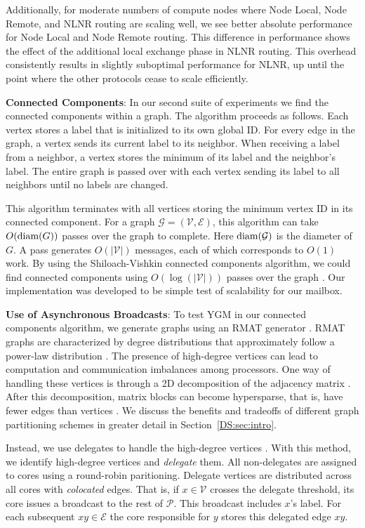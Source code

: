 \documentclass[10]{report}
\begin{document}
Additionally, for moderate numbers of compute nodes where Node Local, Node Remote, and NLNR routing are scaling well, we
see better absolute performance for Node Local and Node Remote routing. 
This difference in performance shows the effect of the additional local exchange phase in NLNR routing.
This overhead consistently results in slightly suboptimal performance for NLNR, up until the point where the other protocols cease to scale efficiently.  


\noindent
\textbf{Connected Components}:
In our second suite of experiments we find the connected components within a graph. 
The algorithm proceeds as follows.
Each vertex stores a label that is initialized to its own global ID. 
For every edge in the graph, a vertex sends its current label to its neighbor. 
When receiving a label from a neighbor, a vertex stores the minimum of its label and the neighbor's label. 
The entire graph is passed over with each vertex sending its label to all neighbors until no labels are changed.

This algorithm terminates with all vertices storing the minimum vertex ID in its connected component. 
For a graph $\mathcal{G} =(\mathcal{V}, \mathcal{E})$, this algorithm can take $O(\textnormal{diam}(G))$ passes over the graph to complete.
Here $\textnormal{diam}(\mathcal{G})$ is the diameter of $G$.
A pass generates $O(|\mathcal{V}|)$ messages, each of which corresponds to $O(1)$ work. 
By using the Shiloach-Vishkin connected components algorithm, we could find connected components using $O(\log(|\mathcal{V}|))$ passes over the graph \cite{shiloach1982an}. 
Our implementation was developed to be simple test of scalability for our mailbox.

\noindent
\textbf{Use of Asynchronous Broadcasts}:
To test YGM in our connected components algorithm, we generate graphs using an RMAT generator \cite{chakrabarti2004r}. 
RMAT graphs are characterized by degree distributions that approximately follow a power-law distribution \cite{seshadhri2013depth}.  
The presence of high-degree vertices can lead to computation and communication imbalances among processors. 
One way of handling these vertices is through a 2D decomposition of the adjacency matrix \cite{bulucc2011parallel}. 
After this decomposition, matrix blocks can become hypersparse, that is, have fewer edges than vertices \cite{buluc2008representation}.
We discuss the benefits and tradeoffs of different graph partitioning schemes in greater detail in Section~\ref{DS:sec:intro}.

Instead, we use delegates to handle the high-degree vertices \cite{pearce2014faster}. 
With this method, we identify high-degree vertices and \emph{delegate} them. 
All non-delegates are assigned to cores using a round-robin paritioning.
Delegate vertices are distributed across all cores with \emph{colocated} edges.
That is, if $x \in \mathcal{V}$ crosses the delegate threshold, its core issues a broadcast to the rest of $\mathcal{P}$.
This broadcast includes $x$'s label.
For each subsequent $xy \in \mathcal{E}$ the core responsible for $y$ stores this delegated edge $xy$.
\end{document}
